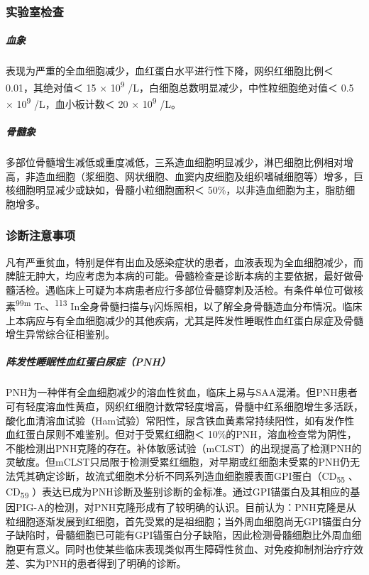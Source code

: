 \subsubsection{实验室检查}

\subparagraph{血象}

表现为严重的全血细胞减少，血红蛋白水平进行性下降，网织红细胞比例＜
0.01，其绝对值＜ 15 × 10\textsuperscript{9}
/L，白细胞总数明显减少，中性粒细胞绝对值＜ 0.5 × 10\textsuperscript{9}
/L，血小板计数＜ 20 × 10\textsuperscript{9} /L。

\subparagraph{骨髓象}

多部位骨髓增生减低或重度减低，三系造血细胞明显减少，淋巴细胞比例相对增高，非造血细胞（浆细胞、网状细胞、血窦内皮细胞及组织嗜碱细胞等）增多，巨核细胞明显减少或缺如，骨髓小粒细胞面积＜
50\%，以非造血细胞为主，脂肪细胞增多。

\subsubsection{诊断注意事项}

凡有严重贫血，特别是伴有出血及感染症状的患者，血液表现为全血细胞减少，而脾脏无肿大，均应考虑为本病的可能。骨髓检查是诊断本病的主要依据，最好做骨髓活检。遇临床上可疑为本病患者应行多部位骨髓穿刺及活检。有条件单位可做核素\textsuperscript{99m}
Tc、\textsuperscript{113}
In全身骨髓扫描与γ闪烁照相，以了解全身骨髓造血分布情况。临床上本病应与有全血细胞减少的其他疾病，尤其是阵发性睡眠性血红蛋白尿症及骨髓增生异常综合征相鉴别。

\subparagraph{阵发性睡眠性血红蛋白尿症（PNH）}


PNH为一种伴有全血细胞减少的溶血性贫血，临床上易与SAA混淆。但PNH患者可有轻度溶血性黄疸，网织红细胞计数常轻度增高，骨髓中红系细胞增生多活跃，酸化血清溶血试验（Ham试验）常阳性，尿含铁血黄素常持续阳性，如有发作性血红蛋白尿则不难鉴别。但对于受累红细胞＜
10\%的PNH，溶血检查常为阴性，不能检测出PNH克隆的存在。补体敏感试验（mCLST）的出现提高了检测PNH的灵敏度。但mCLST只局限于检测受累红细胞，对早期或红细胞未受累的PNH仍无法凭其确定诊断，故流式细胞术分析不同系列造血细胞膜表面GPI蛋白（CD\textsubscript{55}
、CD\textsubscript{59}
）表达已成为PNH诊断及鉴别诊断的金标准。通过GPI锚蛋白及其相应的基因PIG-A的检测，对PNH克隆形成有了较明确的认识。目前认为：PNH克隆是从粒细胞逐渐发展到红细胞，首先受累的是祖细胞；当外周血细胞尚无GPI锚蛋白分子缺陷时，骨髓细胞已可能有GPI锚蛋白分子缺陷，因此检测骨髓细胞比外周血细胞更有意义。同时也使某些临床表现类似再生障碍性贫血、对免疫抑制剂治疗疗效差、实为PNH的患者得到了明确的诊断。

